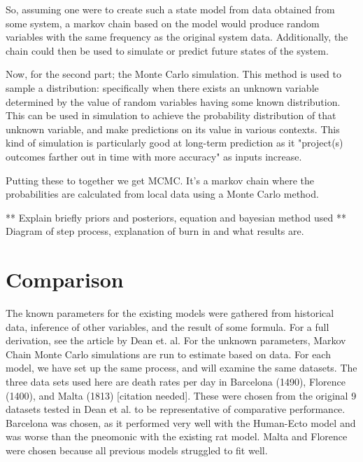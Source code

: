 \documentclass [letterpaper, 12pt] {article}
\begin{document}
So, assuming one were to create such a state model from data obtained from some system, a markov chain based on the model would produce random variables with the same frequency as the original system data. Additionally, the chain could then be used to simulate or predict future states of the system.

Now, for the second part; the Monte Carlo simulation. This method is used to sample a distribution: specifically when there exists an unknown variable determined by the value of random variables having some known distribution. \cite{holmes} This can be used in simulation to achieve the probability distribution of that unknown variable, and make predictions on its value in various contexts. This kind of simulation is particularly good at long-term prediction as it "project(s) outcomes farther out in time with more accuracy" as inputs increase. \cite{ibm_cloud_2020}


Putting these to together we get MCMC. It's a markov chain where the probabilities are calculated from local data using a Monte Carlo method.

** Explain briefly priors and posteriors, equation and bayesian method used
** Diagram of step process, explanation of burn in and what results are.



\newpage



\newpage

\section {Comparison}

The known parameters for the existing models were gathered from historical data, inference of other variables, and the result of some formula. For a full derivation, see the article by Dean et. al. \cite{Dean1304}
For the unknown parameters, Markov Chain Monte Carlo simulations are run to estimate based on data. For each model, we have set up the same process, and will examine the same datasets. The three data sets used here are death rates per day in Barcelona (1490), Florence (1400), and Malta (1813) [citation needed]. These were chosen from the original 9 datasets tested in Dean et al. to be representative of comparative performance. Barcelona was chosen, as it performed very well with the Human-Ecto model and was worse than the pneomonic with the existing rat model. Malta and Florence were chosen because all previous models struggled to fit well.
\end{document}
